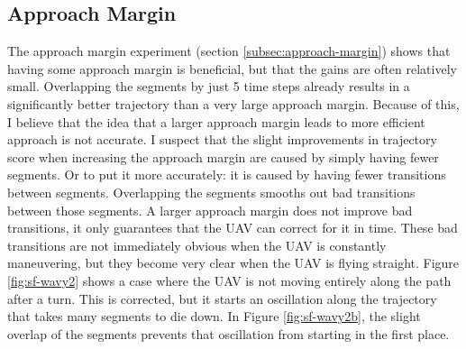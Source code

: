 \subsection{Approach Margin}
The approach margin experiment (section \ref{subsec:approach-margin}) shows that having some approach margin is beneficial, but that the gains are often relatively small. Overlapping the segments by just 5 time steps already results in a significantly better trajectory than a very large approach margin. Because of this, I believe that the idea that a larger approach margin leads to more efficient approach is not accurate. I suspect that the slight improvements in trajectory score when increasing the approach margin are caused by simply having fewer segments. Or to put it more accurately: it is caused by having fewer transitions between segments. Overlapping the segments smooths out bad transitions between those segments. A larger approach margin does not improve bad transitions, it only guarantees that the UAV can correct for it in time. These bad transitions are not immediately obvious when the UAV is constantly maneuvering, but they become very clear when the UAV is flying straight. Figure \ref{fig:sf-wavy2} shows a case where the UAV is not moving entirely along the path after a turn. This is corrected, but it starts an oscillation along the trajectory that takes many segments to die down. In Figure \ref{fig:sf-wavy2b}, the slight overlap of the segments prevents that oscillation from starting in the first place. 

